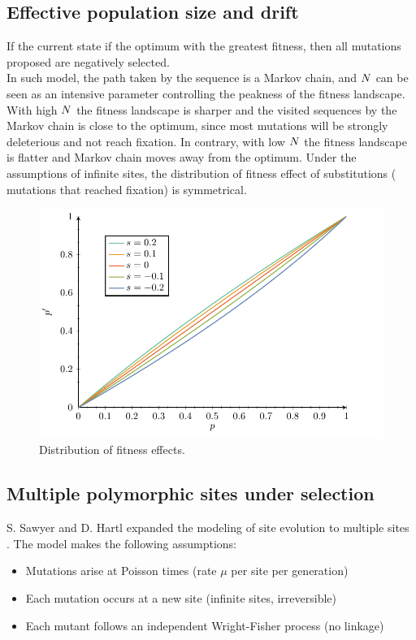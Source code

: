 \subsection{Effective population size and drift}
If the current state if the optimum with the greatest fitness, then all mutations proposed are negatively selected.\\
In such model, the path taken by the sequence is a Markov chain, and $N$ can be seen as an intensive parameter controlling the peakness of the fitness landscape. With high $N$ the fitness landscape is sharper and the visited sequences by the Markov chain is close to the optimum, since most mutations will be strongly deleterious and not reach fixation. In contrary, with low $N$ the fitness landscape is flatter and Markov chain moves away from the optimum.
Under the assumptions of infinite sites, the distribution of fitness effect of substitutions ( mutations that reached fixation) is symmetrical.

\begin{figure}[thbp]
	\begin{center}
		\includegraphics[width=\textwidth, page=1] {figures.pdf}
	\end{center}
	\caption{Distribution of fitness effects.}
\end{figure}


\subsection{Multiple polymorphic sites under selection}
S. Sawyer and D. Hartl expanded the modeling of site evolution to multiple sites \citet{Sawyer1992}. The model makes the following assumptions: 
\begin{itemize}
	\setlength\itemsep{-0.2em}
	\item Mutations arise at Poisson times (rate $\mu$ per site per generation)
	\item Each mutation occurs at a new site (infinite sites, irreversible)
	\item Each mutant follows an independent Wright-Fisher process (no linkage)
\end{itemize}


